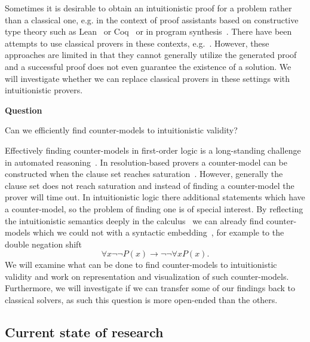 \documentclass{article}
\theoremstyle{definition}
\theoremstyle{definition}
\theoremstyle{definition}
\theoremstyle{definition}
\theoremstyle{definition}
\theoremstyle{definition}
\theoremstyle{definition}
\newcommand{\0}{\mathbf 0}
\newcommand{\1}{\mathbf 1}
\newcounter{question}
\newenvironment{question}{\smallskip\noindent\textbf{Question \refstepcounter{question}\arabic{question}}\begin{em}}{\end{em}}
\newenvironment{method}{\smallskip}{}
\begin{document}
	\begin{method}
		Sometimes it is desirable to obtain an intuitionistic proof for a problem rather than a classical one, e.g. in the context of proof assistants based on constructive type theory such as Lean~\cite{de2015lean} or Coq~\cite{bertot2013interactive} or in program synthesis~\cite{alur2013syntax}. There have been attempts to use classical provers in these contexts, e.g.~\cite{czajka2018hammer,hozzova2023program}. However, these approaches are limited in that they cannot generally utilize the generated proof and a successful proof does not even guarantee the existence of a solution. We will investigate whether we can replace classical provers in these settings with intuitionistic provers. 
	\end{method}

	\vspace*{12pt}

	\begin{question}
		Can we efficiently find counter-models to intuitionistic validity?
	\end{question}

	\begin{method}
		Effectively finding counter-models in first-order logic is a long-standing challenge in automated reasoning~\cite{caferra1992method}. In resolution-based provers a counter-model can be constructed when the clause set reaches saturation~\cite{peltier2003model}. However, generally the clause set does not reach saturation and instead of finding a counter-model the prover will time out. In intuitionistic logic there additional statements which have a counter-model, so the problem of finding one is of special interest. By reflecting the intuitionistic semantics deeply in the calculus~\cite{otten2005clausal} we can already find counter-models which we could not with a syntactic embedding~\cite{pluska2023embedding}, for example to the double negation shift
		\[\forall x\neg\neg P(x)\to\neg\neg\forall xP(x).\]
		We will examine what can be done to find counter-models to intuitionistic validity and work on representation and visualization of such counter-models. Furthermore, we will investigate if we can transfer some of our findings back to classical solvers, as such this question is more open-ended than the others.
	\end{method}

	\subsection{Current state of research}
\end{document}
